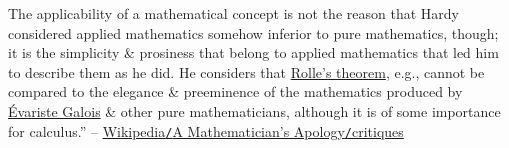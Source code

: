 \documentclass[oneside]{book}
\numberwithin{equation}{section}
\begin{document}
The applicability of a mathematical concept is not the reason that Hardy considered applied mathematics somehow inferior to pure mathematics, though; it is the simplicity \& prosiness that belong to applied mathematics that led him to describe them as he did. He considers that \href{https://en.wikipedia.org/wiki/Rolle%27s_theorem}{Rolle's theorem}, e.g., cannot be compared to the elegance \& preeminence of the mathematics produced by \href{https://en.wikipedia.org/wiki/%C3%89variste_Galois}{\'Evariste Galois} \& other pure mathematicians, although it is of some importance for calculus.'' -- \href{https://en.wikipedia.org/wiki/A_Mathematician%27s_Apology#Critiques}{Wikipedia\texttt{/}A Mathematician's Apology\texttt{/}critiques}

\end{document}
